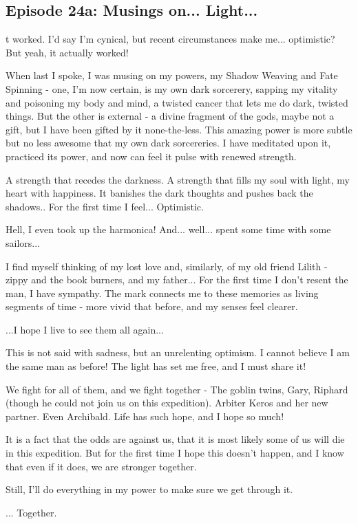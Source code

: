 \subsection{Episode 24a: Musings on... Light...}

t worked. I'd say I'm cynical, but recent circumstances make me... optimistic? But yeah, it actually worked!\medskip

When last I spoke, I was musing on my powers, my Shadow Weaving and Fate Spinning - one, I'm now certain, is my own dark sorcerery, sapping my vitality and poisoning my body and mind, a twisted cancer that lets me do dark, twisted things. But the other is external - a divine fragment of the gods, maybe not a gift, but I have been gifted by it none-the-less. This amazing power is more subtle but no less awesome that my own dark sorcereries. I have meditated upon it, practiced its power, and now can feel it pulse with renewed strength.\medskip

A strength that recedes the darkness. A strength that fills my soul with light, my heart with happiness. It banishes the dark thoughts and pushes back the shadows.. For the first time I feel... Optimistic.\medskip

Hell, I even took up the harmonica! And... well... spent some time with some sailors...\medskip

I find myself thinking of my lost love and, similarly, of my old friend Lilith - zippy and the book burners, and my father... For the first time I don't resent the man, I have sympathy. The mark connects me to these memories as living segments of time - more vivid that before, and my senses feel clearer.\medskip

...I hope I live to see them all again...\medskip

This is not said with sadness, but an unrelenting optimism. I cannot believe I am the same man as before! The light has set me free, and I must share it!\medskip

We fight for all of them, and we fight together - The goblin twins, Gary, Riphard (though he could not join us on this expedition). Arbiter Keros and her new partner. Even Archibald. Life has such hope, and I hope so much!\medskip

It is a fact that the odds are against us, that it is most likely some of us will die in this expedition. But for the first time I hope this doesn't happen, and I know that even if it does, we are stronger together.\medskip

Still, I'll do everything in my power to make sure we get through it.\medskip

... Together.\medskip

\vspace*{5mm}
